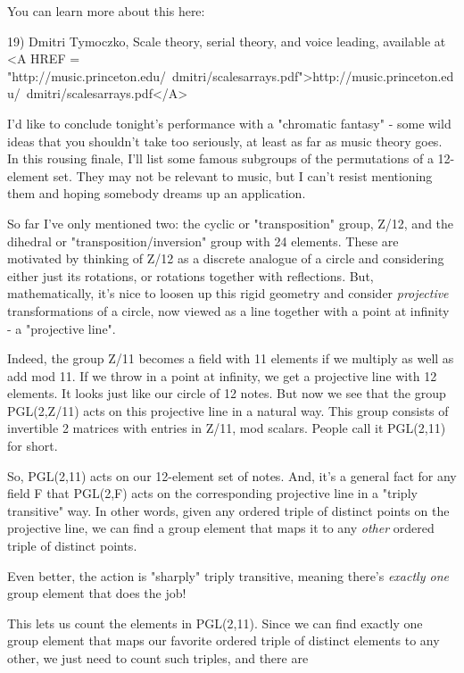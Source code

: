 You can learn more about this here:

19) Dmitri Tymoczko, Scale theory, serial theory, and voice leading,
available at <A HREF = "http://music.princeton.edu/~dmitri/scalesarrays.pdf">http://music.princeton.edu/~dmitri/scalesarrays.pdf</A>

I'd like to conclude tonight's performance with a 
"chromatic fantasy" - some wild ideas that you shouldn't
take too seriously, at least as far as music theory goes.  In this
rousing finale, I'll list some famous subgroups of the permutations of
a 12-element set.  They may not be relevant to music, but I can't
resist mentioning them and hoping somebody dreams up an application.

So far I've only mentioned two: the cyclic or "transposition" group, 
Z/12, and the dihedral or "transposition/inversion" group with 24 
elements.  These are motivated by thinking of Z/12 as a discrete
analogue of a circle and considering either just its rotations, or 
rotations together with reflections.  But, mathematically, it's
nice to loosen up this rigid geometry and consider \emph{projective}
transformations of a circle, now viewed as a line together with a 
point at infinity - a "projective line".

Indeed, the group Z/11 becomes a field with 11 elements if we multiply
as well as add mod 11.  If we throw in a point at infinity, we get a 
projective line with 12 elements.  It looks just like our circle of 12 
notes.  But now we see that the group PGL(2,Z/11) acts on this projective 
line in a natural way.  This group consists of invertible 2 matrices 
with entries in Z/11, mod scalars.  People call it PGL(2,11) for short.

So, PGL(2,11) acts on our 12-element set of notes.  And, it's a 
general fact for any field F that PGL(2,F) acts on the corresponding
projective line in a "triply transitive" way.  In other words, given
any ordered triple of distinct points on the projective line, we can 
find a group element that maps it to any \emph{other} ordered triple of
distinct points.  

Even better, the action is "sharply" triply transitive, meaning
there's \emph{exactly one} group element that does the job!  

This lets us count the elements in PGL(2,11).  Since we can find 
exactly one group element that maps our favorite ordered triple of 
distinct elements to any other, we just need to count such triples,
and there are 

